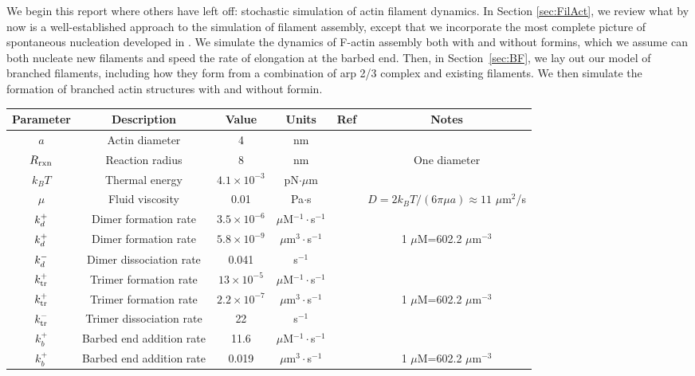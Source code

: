 \documentclass[11pt]{article}
\begin{document}
We begin this report where others have left off: stochastic simulation of actin filament dynamics. In Section \ref{sec:FilAct}, we review what by now is a well-established approach to the simulation of filament assembly, except that we incorporate the most complete picture of spontaneous nucleation developed in \cite{rosenbloom2021mechanism}. We simulate the dynamics of F-actin assembly both with and without formins, which we assume can both nucleate new filaments and speed the rate of elongation at the barbed end. Then, in Section\ \ref{sec:BF}, we lay out our model of branched filaments, including how they form from a combination of arp 2/3 complex and existing filaments. We then simulate the formation of branched actin structures with and without formin.

\begin{table}
\begin{center}
\begin{tabular}{|c|c|c|c|c|c|}\hline
Parameter & Description & Value & Units & Ref & Notes \\ \hline
$a$ & Actin diameter & 4 & nm & & \\
$R_\text{rxn}$ & Reaction radius & 8 & nm & & One diameter \\
$k_B T$ & Thermal energy & $4.1 \times 10^{-3}$ & pN$\cdot \mu$m & & \\ 
$\mu$ & Fluid viscosity & 0.01 & Pa$\cdot$s & & $D=2k_BT/(6 \pi \mu a)\approx 11$ $\mu$m$^2$/s \\  \hline
$k_d^+$ & Dimer formation rate& $3.5 \times 10^{-6}$ & $\mu$M$^{-1}\cdot$s$^{-1}$ & \cite{rosenbloom2021mechanism} & \\ 
$k_d^+$ & Dimer formation rate& $5.8 \times 10^{-9}$ & $\mu$m$^{3} \cdot$s$^{-1}$ & & 1 $\mu$M=602.2 $\mu$m$^{-3}$ \\
$k_d^-$ & Dimer dissociation rate & 0.041 & s$^{-1}$ & \cite{rosenbloom2021mechanism} &\\ \hline
$k_\text{tr}^+$ & Trimer formation rate& $13 \times 10^{-5}$ & $\mu$M$^{-1}\cdot$s$^{-1}$ & \cite{rosenbloom2021mechanism} & \\ 
$k_\text{tr}^+$ & Trimer formation rate& $2.2 \times 10^{-7}$ & $\mu$m$^{3} \cdot$s$^{-1}$ &  & 1 $\mu$M=602.2 $\mu$m$^{-3}$ \\
$k_\text{tr}^-$ & Trimer dissociation rate & 22 & s$^{-1}$ & \cite{rosenbloom2021mechanism} &\\ \hline
$k_b^+$ & Barbed end addition rate& 11.6 & $\mu$M$^{-1}\cdot$s$^{-1}$ & \cite{rosenbloom2021mechanism} & \\ 
$k_b^+$ &  Barbed end addition rate& 0.019 & $\mu$m$^{3} \cdot$s$^{-1}$ &  & 1 $\mu$M=602.2 $\mu$m$^{-3}$ \\

\end{tabular}
\end{center}
\end{table}
\end{document}
